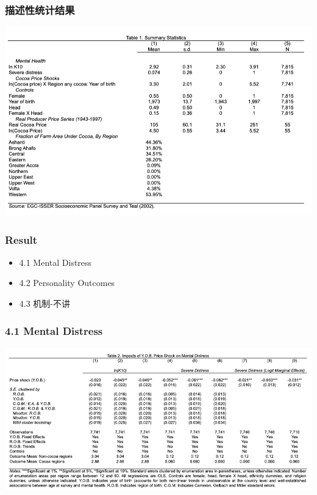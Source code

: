 \documentclass{beamer}
\begin{document}
\begin{frame}
	\frametitle{描述性统计结果}
\includegraphics[scale=0.35]{figures/table1.png}	
\end{frame}
\begin{frame}
	\frametitle{Result}
	\begin{itemize}
		\item 4.1 Mental Distress
		\item 4.2 Personality Outcomes
		\item 4.3 机制-{不讲}
	\end{itemize}

\end{frame}

\begin{frame}
	\frametitle{4.1 Mental Distress}
	\includegraphics[scale=0.35]{figures/table2.png}
\end{frame}
\end{document}
